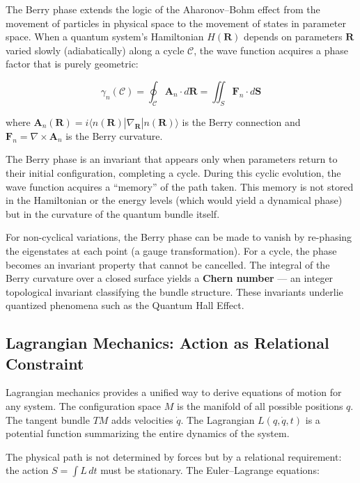 The Berry phase extends the logic of the Aharonov--Bohm effect from the movement of particles in physical space to the movement of states in parameter space. When a quantum system's Hamiltonian $H(\mathbf{R})$ depends on parameters $\mathbf{R}$ varied slowly (adiabatically) along a cycle $\mathcal{C}$, the wave function acquires a phase factor that is purely geometric:

\begin{equation}
\gamma_n(\mathcal{C}) = \oint_\mathcal{C} \mathbf{A}_n \cdot d\mathbf{R} = \iint_S \mathbf{F}_n \cdot d\mathbf{S}
\end{equation}

where $\mathbf{A}_n(\mathbf{R}) = i\langle n(\mathbf{R}) | \nabla_\mathbf{R} | n(\mathbf{R}) \rangle$ is the Berry connection and $\mathbf{F}_n = \nabla \times \mathbf{A}_n$ is the Berry curvature.

The Berry phase is an invariant that appears only when parameters return to their initial configuration, completing a cycle. During this cyclic evolution, the wave function acquires a ``memory'' of the path taken. This memory is not stored in the Hamiltonian or the energy levels (which would yield a dynamical phase) but in the curvature of the quantum bundle itself.

For non-cyclical variations, the Berry phase can be made to vanish by re-phasing the eigenstates at each point (a gauge transformation). For a cycle, the phase becomes an invariant property that cannot be cancelled. The integral of the Berry curvature over a closed surface yields a \textbf{Chern number} --- an integer topological invariant classifying the bundle structure. These invariants underlie quantized phenomena such as the Quantum Hall Effect.

\subsection{Lagrangian Mechanics: Action as Relational Constraint}\label{sec:lagrangian}

Lagrangian mechanics provides a unified way to derive equations of motion for any system. The configuration space $M$ is the manifold of all possible positions $q$. The tangent bundle $TM$ adds velocities $\dot{q}$. The Lagrangian $L(q, \dot{q}, t)$ is a potential function summarizing the entire dynamics of the system.

The physical path is not determined by forces but by a relational requirement: the action $S = \int L\, dt$ must be stationary. The Euler--Lagrange equations:

